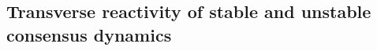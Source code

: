 \documentclass[%
 reprint,
 amsmath,amssymb,
 aip,
]{revtex4-2}
\def \bZ {\pmb{Z}}
\theoremstyle{italichead}
\theoremstyle{definition}
\begin{document}
{



\subsection{Transverse reactivity of stable and unstable consensus dynamics}


}
\end{document}
